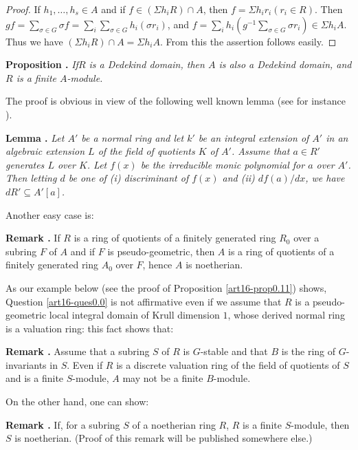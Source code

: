 \begin{proof}
If $h_{1},\ldots,h_{s}\in A$ and if $f\in (\Sigma h_{i}R)\cap A$, then $f=\Sigma h_{i}r_{i}(r_{i}\in R)$. Then $gf=\sum\limits_{\sigma\in G}\sigma f=\sum\limits_{i}\sum\limits_{\sigma\in G}h_{i}(\sigma r_{i})$, and $f=\sum\limits_{i}h_{i}(g^{-1}\sum\limits_{\sigma\in G}\sigma r_{i})\in \Sigma h_{i}A$. Thus we have $(\Sigma h_{i}R)\cap A=\Sigma h_{i}A$. From this the assertion follows easily.
\end{proof}

\medskip
\noindent
{\bf Proposition .\label{art16-prop0.3}}
{\em If\pageoriginale $R$ is a Dedekind domain, then $A$ is also a Dedekind domain, and $R$ is a finite $A$-module.}
\smallskip

The proof is obvious in view of the following well known lemma (see for instance \cite{art16-key-L}).

\medskip
\noindent
{\bf Lemma .\label{art16-lem0.4}}
{\em Let $A'$ be a normal ring and let $k'$ be an integral extension of $A'$ in an algebraic extension $L$ of the field of quotients $K$ of $A'$. Assume that $a\in R'$ generates $L$ over $K$. Let $f(x)$ be the irreducible monic polynomial for $a$ over $A'$. Then letting $d$ be one of {\rm(i)} discriminant of $f(x)$ and {\rm(ii)} $df(a)/dx$, we have $dR'\subseteq A'[a]$.}

Another easy case is:

\medskip
\noindent
{\bf Remark .\label{art16-rem0.5}}
If $R$ is a ring of quotients of a finitely generated ring $R_{0}$ over a subring $F$ of $A$ and if $F$ is pseudo-geometric, then $A$ is a ring of quotients of a finitely generated ring $A_{0}$ over $F$, hence $A$ is noetherian.
\smallskip

As our example below (see the proof of Proposition \ref{art16-prop0.11}) shows, Question \ref{art16-ques0.0} is not affirmative even if we assume that $R$ is a pseudo-geometric local integral domain of Krull dimension $1$, whose derived normal ring is a valuation ring: this fact shows that:

\medskip
\noindent
{\bf Remark .\label{art16-rem0.6}}
Assume that a subring $S$ of $R$ is $G$-stable and that $B$ is the ring of $G$-invariants in $S$. Even if $R$ is a discrete valuation ring of the field of quotients of $S$ and is a finite $S$-module, $A$ may not be a finite $B$-module.
\smallskip

On the other hand, one can show:

\medskip
\noindent
{\bf Remark .\label{art16-rem0.7}}
If, for a subring $S$ of a noetherian ring $R$, $R$ is a finite $S$-module, then $S$ is noetherian. (Proof of this remark will be published somewhere else.)
\smallskip

